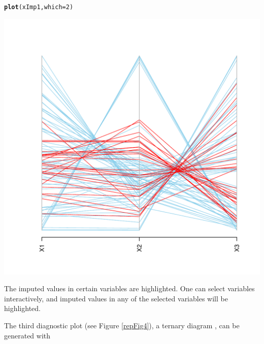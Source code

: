 \documentclass{scrartcl}\usepackage[]{graphicx}\usepackage[]{color}
\makeatletter
\def\maxwidth{ %
  \ifdim\Gin@nat@width>\linewidth
    \linewidth
  \else
    \Gin@nat@width
  \fi
}
\newcommand{\hlnum}[1]{\textcolor[rgb]{0.686,0.059,0.569}{#1}}%
\newcommand{\hlstd}[1]{\textcolor[rgb]{0.345,0.345,0.345}{#1}}%
\newcommand{\hlkwc}[1]{\textcolor[rgb]{0.333,0.667,0.333}{#1}}%
\newcommand{\hlkwd}[1]{\textcolor[rgb]{0.737,0.353,0.396}{\textbf{#1}}}%
\newenvironment{kframe}{%
 \def\at@end@of@kframe{}%
 \ifinner\ifhmode%
  \def\at@end@of@kframe{\end{minipage}}%
  \begin{minipage}{\columnwidth}%
 \fi\fi%
 \def\FrameCommand##1{\hskip\@totalleftmargin \hskip-\fboxsep
 \colorbox{shadecolor}{##1}\hskip-\fboxsep
     \hskip-\linewidth \hskip-\@totalleftmargin \hskip\columnwidth}%
 \MakeFramed {\advance\hsize-\width
   \@totalleftmargin\z@ \linewidth\hsize
   \@setminipage}}%
 {\par\unskip\endMakeFramed%
 \at@end@of@kframe}
\newenvironment{knitrout}{}{} %
\makeatother
\begin{document}
\begin{knitrout}
\color{fgcolor}\begin{kframe}
\begin{alltt}
\hlkwd{plot}\hlstd{(xImp1,} \hlkwc{which}\hlstd{=}\hlnum{2}\hlstd{)}
\end{alltt}
\end{kframe}
\includegraphics[width=\maxwidth]{figure/unnamed-chunk-5-1} 

\end{knitrout}
The imputed values in certain variables are highlighted.
One can select variables interactively, and imputed values in any of the 
 selected variables will be highlighted. 


The third diagnostic plot (see Figure \ref{repFig4}), a ternary diagram \citep{Aitchison86},
 can be generated with 
 
\end{document}

